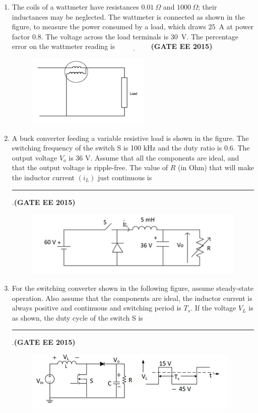 \documentclass[a4paper,12pt]{exam}
\theoremstyle{remark}
\begin{document}
\begin{enumerate}
\item The coils of a wattmeter have resistances $0.01~\Omega$ and $1000~\Omega$; their inductances may be neglected. The wattmeter is connected as shown in the figure, to measure the power consumed by a load, which draws $25$~A at power factor $0.8$. The voltage across the load terminals is $30$~V. The percentage error on the wattmeter reading is $\underline{\hspace{2cm}}$\hfill{\textbf{(GATE EE 2015)}}
\begin{figure}[H]
    \centering
    \includegraphics[width=0.5\columnwidth]{figs/2Q 40.png}
    \caption{}
    \label{fig:placeholder}
\end{figure}

\item A buck converter feeding a variable resistive load is shown in the figure. The switching frequency of the switch S is 100 kHz and the duty ratio is 0.6. The output voltage $V_o$ is 36 V. Assume that all the components are ideal, and that the output voltage is ripple-free. The value of $R$ (in Ohm) that will make the inductor current $(i_L)$ just continuous is \rule{2cm}{0.15mm}.\hfill{\textbf{(GATE EE 2015)}}
\begin{figure}[H]
    \centering
    \includegraphics[width=0.8\columnwidth]{figs/2Q 41.png}
    \caption{}
    \label{fig:placeholder}
\end{figure}

\item For the switching converter shown in the following figure, assume steady-state operation. Also assume that the components are ideal, the inductor current is always positive and continuous and switching period is $T_s$. If the voltage $V_L$ is as shown, the duty cycle of the switch S is \rule{2cm}{0.15mm}.\hfill{\textbf{(GATE EE 2015)}}
\begin{figure}[H]
    \centering
    \includegraphics[width=0.75\columnwidth]{figs/2Q 42.png}
    \caption{}
    \label{fig:placeholder}
\end{figure}


\end{enumerate}
\end{document}

